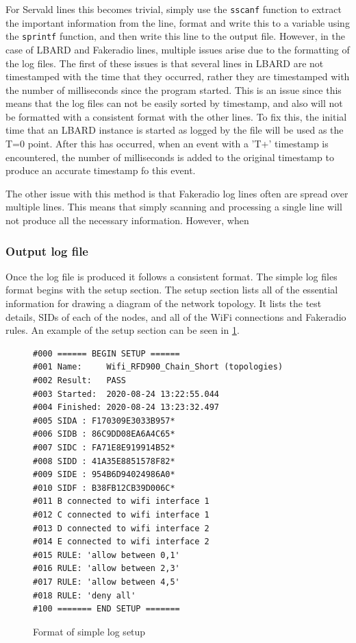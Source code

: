 For Servald lines this becomes trivial, simply use the \verb|sscanf| function to extract the important information from the line, format and write this to a variable using the \verb|sprintf| function, and then write this line to the output file. 
However, in the case of LBARD and Fakeradio lines, multiple issues arise due to the formatting of the log files.
The first of these issues is that several lines in LBARD are not timestamped with the time that they occurred, rather they are timestamped with the number of milliseconds since the program started.
This is an issue since this means that the log files can not be easily sorted by timestamp, and also will not be formatted with a consistent format with the other lines.
To fix this, the initial time that an LBARD instance is started as logged by the file will be used as the T=0 point.
After this has occurred, when an event with a 'T+' timestamp is encountered, the number of milliseconds is added to the original timestamp to produce an accurate timestamp fo this event.

The other issue with this method is that Fakeradio log lines often are spread over multiple lines.
This means that simply scanning and processing a single line will not produce all the necessary information.
However, when 

\subsubsection{Output log file}

Once the log file is produced it follows a consistent format.
The simple log files format begins with the setup section.
The setup section lists all of the essential information for drawing a diagram of the network topology. 
It lists the test details, SIDs of each of the nodes, and all of the WiFi connections and Fakeradio rules. 
An example of the setup section can be seen in \figurename{ \ref{fig:chapter5SimpleLogSetup}}.

\begin{figure}
    \begin{centering}
\begin{lstlisting}[frame=single]
#000 ====== BEGIN SETUP ======
#001 Name:     Wifi_RFD900_Chain_Short (topologies)
#002 Result:   PASS
#003 Started:  2020-08-24 13:22:55.044
#004 Finished: 2020-08-24 13:23:32.497
#005 SIDA : F170309E3033B957*
#006 SIDB : 86C9DD08EA6A4C65*
#007 SIDC : FA71E8E919914B52*
#008 SIDD : 41A35E8851578F82*
#009 SIDE : 954B6D94024986A0*
#010 SIDF : B38FB12CB39D006C*
#011 B connected to wifi interface 1
#012 C connected to wifi interface 1
#013 D connected to wifi interface 2
#014 E connected to wifi interface 2
#015 RULE: 'allow between 0,1'
#016 RULE: 'allow between 2,3'
#017 RULE: 'allow between 4,5'
#018 RULE: 'deny all'
#100 ======= END SETUP =======    
\end{lstlisting}
    \caption{Format of simple log setup}
    \label{fig:chapter5SimpleLogSetup}
    \end{centering}
\end{figure}

